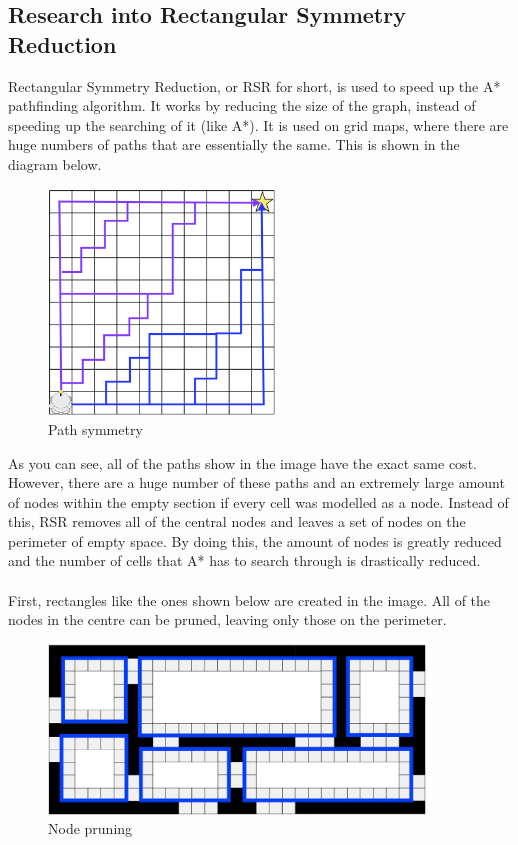 \documentclass[titlepage]{article}
\begin{document}
\subsection{Research into Rectangular Symmetry Reduction}
Rectangular Symmetry Reduction, or RSR for short, is used to speed up the A* pathfinding algorithm. It works by reducing the size of the graph, instead of speeding up the searching of it (like A*). It is used on grid maps, where there are huge numbers of paths that are essentially the same. This is shown in the diagram below.

\begin{figure}[H]
  \centering
  \includegraphics[width=6cm]{simmytree.png}
  \caption{Path symmetry}
  \label{fig:boat1}
\end{figure}

As you can see, all of the paths show in the image have the exact same cost. However, there are a huge number of these paths and an extremely large amount of nodes within the empty section if every cell was modelled as a node. Instead of this, RSR removes all of the central nodes and leaves a set of nodes on the perimeter of empty space. By doing this, the amount of nodes is greatly reduced and the number of cells that A* has to search through is drastically reduced.\\\\

First, rectangles like the ones shown below are created in the image. All of the nodes in the centre can be pruned, leaving only those on the perimeter.

\begin{figure}[H]
  \centering
  \includegraphics[width=10cm]{rsr1.png}
  \caption{Node pruning}
  \label{fig:boat1}
\end{figure}
\end{document}
